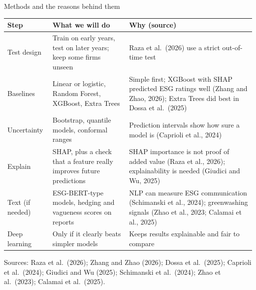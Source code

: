 \documentclass[aspectratio=169,11pt]{beamer}
\newcommand{\src}[1]{\par\vfill{\tiny\color{navy!60}Sources: #1}}
\begin{document}
\begin{frame}[t]{Methods and the reasons behind them}
\scriptsize
\begin{tabular}{@{}p{2.3cm}p{5.0cm}p{5.9cm}@{}}
\toprule
\rowcolor{softteal} \textbf{Step} & \textbf{What we will do} & \textbf{Why (source)} \\
\midrule
Test design & Train on early years, test on later years; keep some firms unseen & Raza et al.\ (2026) use a strict out-of-time test \\
Baselines & Linear or logistic, Random Forest, XGBoost, Extra Trees & Simple first; XGBoost with SHAP predicted ESG ratings well (Zhang and Zhao, 2026); Extra Trees did best in Dossa et al.\ (2025) \\
Uncertainty & Bootstrap, quantile models, conformal ranges & Prediction intervals show how sure a model is (Caprioli et al., 2024) \\
Explain & SHAP, plus a check that a feature really improves future predictions & SHAP importance is not proof of added value (Raza et al., 2026); explainability is needed (Giudici and Wu, 2025) \\
Text (if needed) & ESG-BERT-type models, hedging and vagueness scores on reports & NLP can measure ESG communication (Schimanski et al., 2024); greenwashing signals (Zhao et al., 2023; Calamai et al., 2025) \\
Deep learning & Only if it clearly beats simpler models & Keeps results explainable and fair to compare \\
\bottomrule
\end{tabular}
\src{Raza et al.\ (2026); Zhang and Zhao (2026); Dossa et al.\ (2025); Caprioli et al.\ (2024); Giudici and Wu (2025); Schimanski et al.\ (2024); Zhao et al.\ (2023); Calamai et al.\ (2025).}
\end{frame}
\end{document}
